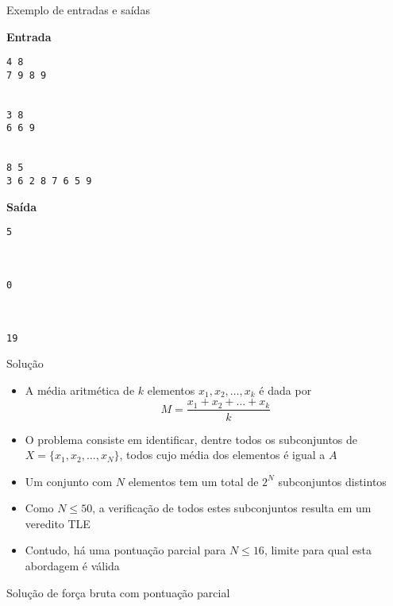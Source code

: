 \begin{frame}[fragile]{Exemplo de entradas e saídas}

\begin{minipage}[t]{0.45\textwidth}
\textbf{Entrada}
\begin{verbatim}
4 8
7 9 8 9


3 8
6 6 9


8 5
3 6 2 8 7 6 5 9
\end{verbatim}
\end{minipage}
\begin{minipage}[t]{0.5\textwidth}
\textbf{Saída}
\begin{verbatim}
5



0



19
\end{verbatim}
\end{minipage}
\end{frame}

\begin{frame}[fragile]{Solução}

    \begin{itemize}
        \item A média aritmética de $k$ elementos $x_1, x_2, \ldots, x_k$ é dada por
        \[
            M = \frac{x_1 + x_2 + \ldots + x_k}{k}
        \]

        \item O problema consiste em identificar, dentre todos os subconjuntos de $X = \{ x_1, x_2,
            \ldots, x_N \}$, todos cujo média dos elementos é igual a $A$

        \item Um conjunto com $N$ elementos tem um total de $2^N$ subconjuntos distintos

        \item Como $N \leq 50$, a verificação de todos estes subconjuntos resulta em um veredito
            TLE
        
        \item Contudo, há uma pontuação parcial para $N\leq 16$, limite para qual esta abordagem
            é válida

    \end{itemize}

\end{frame}

\begin{frame}[fragile]{Solução de força bruta com pontuação parcial}
\end{frame}

